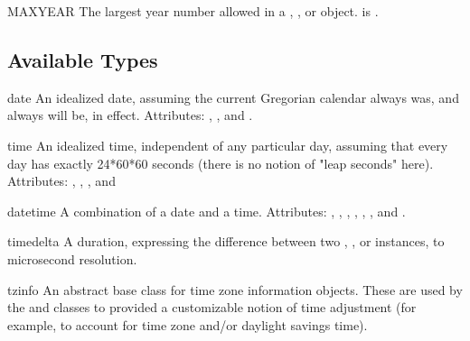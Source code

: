 \begin{datadesc}{MAXYEAR}
  The largest year number allowed in a , ,
  or  object.   is .
\end{datadesc}

\begin{seealso}
\end{seealso}

\subsection{Available Types}

\begin{classdesc*}{date}
  An idealized {\naive} date, assuming the current Gregorian calendar
  always was, and always will be, in effect.
  Attributes: , , and .
\end{classdesc*}

\begin{classdesc*}{time}
  An idealized {\naive} time, independent of any particular day, assuming
  that every day has exactly 24*60*60 seconds (there is no notion
  of "leap seconds" here).
  Attributes: , , , and
\end{classdesc*}

\begin{classdesc*}{datetime}
  A combination of a {\naive} date and a {\naive} time.
  Attributes: , , ,
              , , ,
              and .
\end{classdesc*}

\begin{classdesc*}{timedelta}
  A duration, expressing the difference between two ,
  , or  instances, to microsecond
  resolution.
\end{classdesc*}

\begin{classdesc*}{tzinfo}
  An abstract base class for time zone information objects.  These
  are used by the    and  classes to
  provided a customizable notion of time adjustment (for example, to
  account for time zone and/or daylight savings time).
\end{classdesc*}

